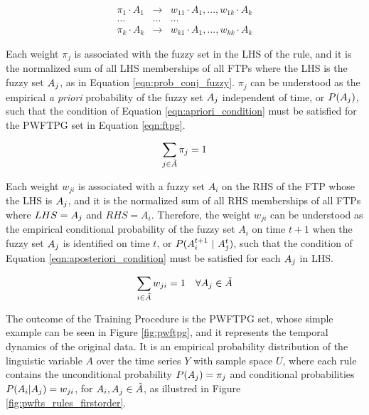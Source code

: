 \begin{enumerate}
\begin{equation}
\begin{array}{rcl}
\pi_1 \cdot A_1 & \rightarrow &  w_{11} \cdot A_1, ..., w_{1k} \cdot A_k \\
\ldots & \ldots & \ldots \\
\pi_k \cdot A_k & \rightarrow &  w_{k1} \cdot A_1, ..., w_{kk} \cdot A_k
\end{array}
\label{eqn:ftpg}
\end{equation}

Each weight $\pi_j$ is associated with the fuzzy set in the LHS of the rule, and it is the normalized sum of all LHS memberships of all FTPs where the LHS is the fuzzy set $A_j$, as in Equation \eqref{eqn:prob_conj_fuzzy}. $\pi_j$ can be understood as the empirical \textit{a priori} probability of the fuzzy set $A_j$ independent of time, or $P(A_j)$, such that the condition of Equation \eqref{eqn:apriori_condition} must be satisfied for the PWFTPG set in Equation \eqref{eqn:ftpg}.

\begin{equation}
    \sum_{j \in \tilde{A}} \pi_j = 1
    \label{eqn:apriori_condition}
\end{equation}

Each weight $w_{ji}$ is associated with a fuzzy set $A_i$ on the RHS of the FTP whose the LHS is $A_j$, and it is the normalized sum of all RHS memberships of all FTPs where $LHS = A_j$ and $RHS = A_i$. Therefore, the weight $w_{ji}$ can be understood as the empirical conditional probability of the fuzzy set $A_i$ on time $t+1$ when the fuzzy set $A_j$ is identified on time $t$, or $P(A_i^{t+1}\ |\ A_j^t)$, such that the condition of Equation \eqref{eqn:aposteriori_condition} must be satisfied for each $A_j$ in LHS.

\begin{equation}
    \sum_{i \in \tilde{A}} w_{ji} = 1 \quad \forall A_j \in \tilde{A}
    \label{eqn:aposteriori_condition}
\end{equation}


\end{enumerate}

The outcome of the Training Procedure is the PWFTPG set, whose simple example can be seen in Figure \ref{fig:pwftpg}, and it represents the temporal dynamics of the original data. It is an empirical probability distribution of the linguistic variable $A$ over the time series $Y$ with sample space $U$, where each rule contains the unconditional probability $P(A_j) = \pi_j$ and conditional probabilities $P(A_i | A_j) = w_{ji}$, for $A_i,A_j \in \tilde{A}$, as illustred in Figure \ref{fig:pwfts_rules_firstorder}.

